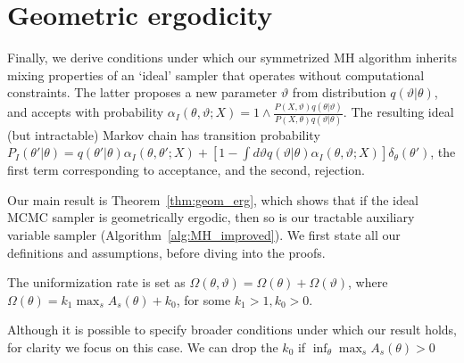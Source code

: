 \section{Geometric ergodicity}
Finally, we derive conditions under which our symmetrized 
MH algorithm
inherits mixing properties of an `ideal' sampler that operates without
computational constraints. The latter proposes a new parameter $\vartheta$
from distribution $q(\vartheta|\theta)$, and accepts with probability
$\alpha_I(\theta,\vartheta; X) = 1 \wedge \frac{P(X , \vartheta)q(\theta| \vartheta)}
{P(X , \theta)q(\vartheta|\theta)}$.  The resulting ideal (but intractable)
Markov chain has transition probability
$P_I(\theta'|\theta) = q(\theta'|\theta)\alpha_I(\theta,\theta';X) + \left[1-\int d\vartheta
q(\vartheta|\theta)\alpha_I(\theta,\vartheta;X)\right]\delta_\theta(\theta')$, the first
term corresponding to acceptance, and the second, rejection.

Our main result is Theorem~\ref{thm:geom_erg}, which shows that if the ideal MCMC
sampler is geometrically ergodic, then so is our tractable auxiliary
variable sampler (Algorithm~\ref{alg:MH_improved}). 
We first state all our definitions and assumptions, before diving into the 
proofs.
\begin{assumption}
The uniformization rate is set as $\Omega(\theta, \vartheta) = \Omega(\theta) + 
\Omega(\vartheta)$, where %
$\Omega(\theta) = k_1 \max_s A_{s}(\theta) + k_0$, for some 
$k_1 > 1, k_0 > 0$.
\label{asmp:unif_rate}
\end{assumption}
\noindent Although it is possible to specify broader conditions under which our 
result holds, for clarity we focus on this case. 
We can drop the $k_0$ if $\inf_\theta \max_s A_s(\theta) > 0$

